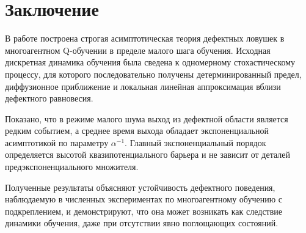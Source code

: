 \documentclass[12pt,a4paper]{article}
\theoremstyle{definition}
\begin{document}
\section{Заключение}

В работе построена строгая асимптотическая теория
дефектных ловушек
в многоагентном Q-обучении
в пределе малого шага обучения.
Исходная дискретная динамика обучения
была сведена к одномерному стохастическому процессу,
для которого последовательно получены
детерминированный предел,
диффузионное приближение
и локальная линейная аппроксимация
вблизи дефектного равновесия.

Показано, что в режиме малого шума
выход из дефектной области
является редким событием,
а среднее время выхода
обладает экспоненциальной асимптотикой
по параметру $\alpha^{-1}$.
Главный экспоненциальный порядок
определяется высотой квазипотенциального барьера
и не зависит от деталей предэкспоненциального множителя.

Полученные результаты
объясняют устойчивость дефектного поведения,
наблюдаемую в численных экспериментах
по многоагентному обучению с подкреплением,
и демонстрируют,
что она может возникать
как следствие динамики обучения,
даже при отсутствии явно поглощающих состояний.
\end{document}
